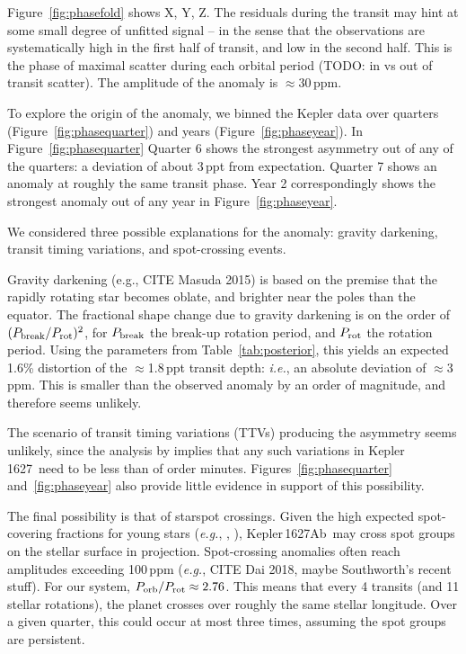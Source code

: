 \documentclass[12pt,modern,twocolumn,tighten]{aastex63}
\newcommand{\sn}{Kepler\,1627} %
\newcommand{\pn}{Kepler\,1627Ab} %
\begin{document}
Figure~\ref{fig:phasefold} shows X, Y, Z.  The residuals during the
transit may hint at some small degree of unfitted signal -- in the
sense that the observations are systematically high in the first half
of transit, and low in the second half.  This is the phase of maximal
scatter during each orbital period (TODO: in vs out of transit
scatter).  The amplitude of the anomaly is $\approx$30\,ppm.

To explore the origin of the anomaly, we binned the Kepler data over
quarters (Figure~\ref{fig:phasequarter}) and years
(Figure~\ref{fig:phaseyear}).  In Figure~\ref{fig:phasequarter}
Quarter 6 shows the strongest asymmetry out of any of the quarters: a
deviation of about 3\,ppt from expectation.  Quarter 7 shows an
anomaly at roughly the same transit phase.  Year 2 correspondingly
shows the strongest anomaly out of any year in
Figure~\ref{fig:phaseyear}.

We considered three possible explanations for the anomaly: gravity
darkening, transit timing variations, and spot-crossing events.

Gravity darkening (e.g., CITE Masuda 2015) is based on the premise
that the rapidly rotating star becomes oblate, and brighter near the
poles than the equator.  The fractional shape change due to gravity
darkening is on the order of $(P_{\rm break}/P_{\rm rot})^2$, for
$P_{\rm break}$ the break-up rotation period, and $P_{\rm rot}$ the
rotation period.  Using the parameters from Table~\ref{tab:posterior},
this yields an expected 1.6\% distortion of the $\approx$1.8\,ppt
transit depth: {\it i.e.}, an absolute deviation of $\approx$3\,ppm.
This is smaller than the observed anomaly by an order of magnitude,
and therefore seems unlikely.

The scenario of transit timing variations (TTVs) producing the
asymmetry seems unlikely, since the analysis by
\citet{holczer_transit_2016} implies that any such variations in \sn\
need to be less than of order minutes.  Figures~\ref{fig:phasequarter}
and~\ref{fig:phaseyear} also provide little evidence in support of
this possibility.

The final possibility is that of starspot crossings.  Given the high
expected spot-covering fractions for young stars ({\it e.g.},
\citealt{morris_relationship_2020}, \citealt{plavchan_planet_2020}),
\pn\ may cross spot groups on the stellar surface in projection.
Spot-crossing anomalies often reach amplitudes exceeding 100\,ppm
({\it e.g.}, CITE Dai 2018, maybe Southworth's recent stuff).  For our
system,  $P_{\rm orb}/P_{\rm rot} \approx 2.76$.  This means that
every 4 transits (and 11 stellar rotations), the planet crosses over
roughly the same stellar longitude.  Over a given quarter, this could
occur at most three times, assuming the spot groups are persistent.  
\end{document}
